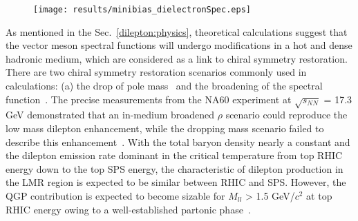 \begin{figure}[htbp]
\centering
\texttt{[image: results/minibias\_dielectronSpec.eps]}
 \label{minibias_spec}
\end{figure}

As mentioned in the Sec.~\ref{dilepton:physics}, theoretical calculations suggest that the vector meson spectral functions will undergo modifications in a hot and dense hadronic medium, which are considered as a link to chiral symmetry restoration. There are two chiral symmetry restoration scenarios commonly used in calculations: (a) the drop of pole mass~\cite{dropmass} and the broadening of the spectral function~\cite{broaden0,broaden1,broaden2,broaden3,broaden4}. The precise measurements from the NA60 experiment at $\sqrt{s_{NN}}$ = 17.3 GeV demonstrated that an in-medium broadened $\rho$ scenario could reproduce the low mass dilepton enhancement, while the dropping mass scenario failed to describe this enhancement~\cite{NA60:dimuon0,NA60:dimuon3}. With the total baryon density nearly a constant and the dilepton emission rate dominant in the critical temperature from top RHIC energy down to the top SPS energy, the characteristic of dilepton production in the LMR region is expected to be similar between RHIC and SPS. However, the QGP contribution is expected to become sizable for $M_{ll}$ > 1.5 GeV/$c^{2}$ at top RHIC energy owing to a well-established partonic phase~\cite{broaden1}.

